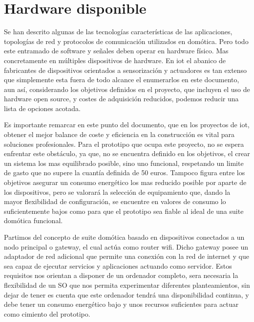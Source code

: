 \section{Hardware disponible}
\label{ch:Capitulo2.4}

Se han descrito algunas de las tecnologías características de las aplicaciones, topologías de red y protocolos de comunicación utilizados en domótica. Pero todo este entramado de software y señales deben operar en hardware físico. Mas concretamente en múltiples dispositivos de hardware. En \gls{iot} el abanico de fabricantes de dispositivos orientados a sensorización y actuadores es tan extenso que simplemente esta fuera de todo alcance el enumerarlos en este documento, aun así, considerando los objetivos definidos en el proyecto, que incluyen el uso de hardware open source, y costes de adquisición reducidos, podemos reducir una lista de opciones acotada.

\vspace{1.5cm}

Es importante remarcar en este punto del documento, que en los proyectos de \gls{iot}, obtener el mejor balance de coste y eficiencia en la construcción es vital para soluciones profesionales. Para el prototipo que ocupa este proyecto, no se espera enfrentar este obstáculo, ya que, no se encuentra definido en los objetivos, el crear un sistema los mas equilibrado posible, sino uno funcional, respetando un limite de gasto que no supere la cuantía definida de 50 euros. Tampoco figura entre los objetivos asegurar un consumo energético los mas reducido posible por aparte de los dispositivos, pero se valorará la selección de equipamiento que, dando la mayor flexibilidad de configuración, se encuentre en valores de consumo lo suficientemente bajos como para que el prototipo sea fiable al ideal de una suite domótica funcional.

\vspace{1.5cm}

Partimos del concepto de suite domótica basado en dispositivos conectados a un nodo principal o gateway, el cual actúa como router wifi. Dicho gateway posee un adaptador de red adicional que permite una conexión con la red de internet y que sea capaz de ejecutar servicios y aplicaciones actuando como servidor. Estos requisitos nos orientan a disponer de un ordenador completo, sera necesaria la flexibilidad de un SO que nos permita experimentar diferentes planteamientos, sin dejar de tener es cuenta que este ordenador tendrá una disponibilidad continua, y debe tener un consumo energético bajo y unos recursos suficientes para actuar como cimiento del prototipo.

